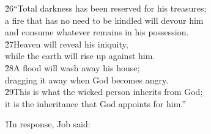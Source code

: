 \begin{poetry}
\poeml \v{26}``Total darkness has been reserved for his treasures; \\
\poemll    a fire that has no need to be kindled will devour him \\
\poemlll       and consume whatever remains in his possession. \\
\poeml \v{27}Heaven will reveal his iniquity, \\
\poemll    while the earth will rise up against him. \\
\poeml \v{28}A flood will wash away his house; \\
\poemll    dragging it away when God becomes angry. \\
\poeml \v{29}This is what the wicked person inherits from God; \\
\poemll    it is the inheritance that God appoints for him.''
\end{poetry}

\v{1}In response, Job said:

